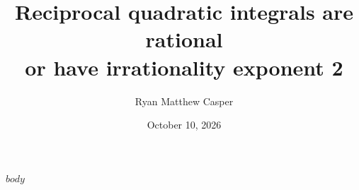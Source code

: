 \documentclass[11pt]{article}
\title{Reciprocal quadratic integrals are rational\\or have irrationality exponent 2}
\author{Ryan Matthew Casper}
\date{October 10, 2026}
\begin{document}
\maketitle
$body$
\end{document}
